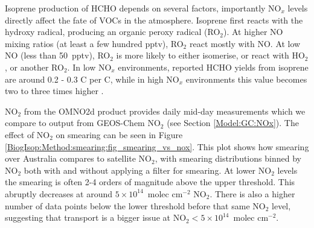       Isoprene production of HCHO depends on several factors, importantly NO$_x$ levels directly affect the fate of VOCs in the atmosphere.
      Isoprene first reacts with the hydroxy radical, producing an organic peroxy radical (RO$_2$).
      At higher NO mixing ratios (at least a few hundred pptv), RO$_2$ react mostly with NO. 
      At low NO (less than 50~pptv), RO$_2$ is more likely to either isomerise, or react with HO$_2$, or another RO$_2$.
      In low NO$_x$ environments, reported HCHO yields from isoprene are around 0.2 - 0.3 C per C, while in high NO$_x$ environments this value becomes two to three times higher \parencite{Palmer2003, Wolfe2016}.

      
      NO$_2$ from the OMNO2d product provides daily mid-day measurements which we compare to output from GEOS-Chem NO$_2$ (see Section \ref{Model:GC:NOx}).
      The effect of NO$_2$ on smearing can be seen in Figure \ref{BiogIsop:Method:smearing:fig_smearing_vs_nox}.
      This plot shows how smearing over Australia compares to satellite NO$_2$, with smearing distributions binned by NO$_2$ both with and without applying a filter for smearing.
      At lower NO$_2$ levels the smearing is often 2-4 orders of magnitude above the upper threshold. 
      This abruptly decreases at around $5 \times 10^{14} $~molec cm$^{-2}$ NO$_2$.
      There is also a higher number of data points below the lower threshold before that same NO$_2$ level, suggesting that transport is a bigger issue at NO$_2 < 5 \times 10^{14} $~molec cm$^{-2}$. 
      
      

